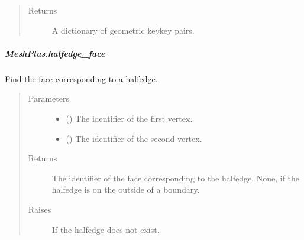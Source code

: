 \documentclass[letterpaper,10pt,english]{sphinxmanual}
\begin{document}
\begin{fulllineitems}
\begin{fulllineitems}
\begin{quote}
\begin{description}
\item[{Returns}] \leavevmode
{} \textendash{} A dictionary of geometric key\sphinxhyphen{}key pairs.

\end{description}\end{quote}

\end{fulllineitems}



\subparagraph{MeshPlus.halfedge\_face}
\label{\detokenize{api/generated/directional_clustering.mesh.MeshPlus.halfedge_face:meshplus-halfedge-face}}\label{\detokenize{api/generated/directional_clustering.mesh.MeshPlus.halfedge_face::doc}}

\begin{fulllineitems}
\label{\detokenize{api/generated/directional_clustering.mesh.MeshPlus.halfedge_face:directional_clustering.mesh.MeshPlus.halfedge_face}}
Find the face corresponding to a halfedge.
\begin{quote}\begin{description}
\item[{Parameters}] \leavevmode\begin{itemize}
\item {} 
 () \textendash{} The identifier of the first vertex.

\item {} 
 () \textendash{} The identifier of the second vertex.

\end{itemize}

\item[{Returns}] \leavevmode
{} \textendash{} The identifier of the face corresponding to the halfedge.
None, if the halfedge is on the outside of a boundary.

\item[{Raises}] \leavevmode
{} \textendash{} If the halfedge does not exist.

\end{description}\end{quote}

\end{fulllineitems}
\end{fulllineitems}
\end{document}
